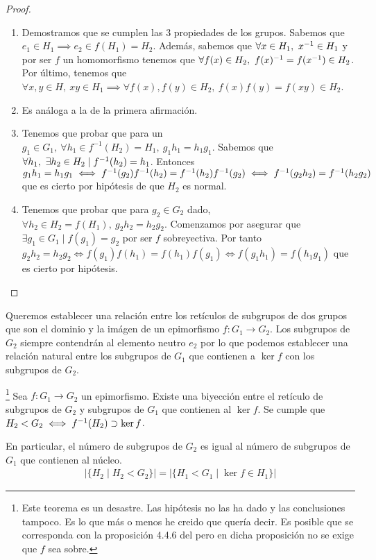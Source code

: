 \begin{proof}$ $\newline
	\begin{enumerate}
		\item Demostramos que se cumplen las 3 propiedades de los grupos. Sabemos que $e_1 \in H_1 \implies e_2 \in f(H_1) = H_2$. Además, sabemos que $\forall x \in H_1,\ \inv{x} \in H_1$ y por ser $f$ un homomorfismo tenemos que $\forall f(x) \in H_2,\ f(x)^{-1} = f(x^{-1}) \in H_2$. Por último, tenemos que $\forall x,y \in H,\ xy \in H_1 \implies \forall f(x),f(y) \in H_2,\ f(x)f(y) = f(xy) \in H_2$.
		\item Es análoga a la de la primera afirmación.
		\item Tenemos que probar que para un $g_1 \in G_1,\ \forall h_1 \in f^{-1}(H_2) = H_1,\ g_1 h_1 = h_1 g_1$. Sabemos que $\forall h_1,\ \exists h_2 \in H_2 \mid f^{-1}(h_2) = h_1$. Entonces $g_1h_1 = h_1 g_1 \iff f^{-1}(g_2)f^{-1}(h_2) = f^{-1}(h_2)f^{-1}(g_2) \iff f^{-1}(g_2h_2) = f^{-1}(h_2g_2)$ que es cierto por hipótesis de que $H_2$ es normal.
		\item Tenemos que probar que para $g_2 \in G_2$ dado, $\forall h_2 \in H_2 = f(H_1),\ g_2h_2 = h_2g_2$. Comenzamos por asegurar que $\exists g_1 \in G_1 \mid f(g_1) = g_2$ por ser $f$ sobreyectiva. Por tanto $g_2h_2 = h_2 g_2 \iff f(g_1)f(h_1) = f(h_1)f(g_1) \iff f(g_1h_1) = f(h_1g_1)$ que es cierto por hipótesis.
	\end{enumerate}
\end{proof}

Queremos establecer una relación entre los retículos de subgrupos de dos grupos que son el dominio y la imágen de un epimorfismo $f: G_1 \to G_2$. Los subgrupos de $G_2$ siempre contendrán al elemento neutro $e_2$ por lo que podemos establecer una relación natural entre los subgrupos de $G_1$ que contienen a $\ker f$ con los subgrupos de $G_2$.

\begin{thm}\label{thm:correspondenciasubgrupos}\footnote{Este teorema es un desastre. Las hipótesis no las ha dado y las conclusiones tampoco. Es lo que más o menos he creido que quería decir. Es posible que se corresponda con la proposición 4.4.6 del \cite{dor96} pero en dicha proposición no se exige que $f$ sea sobre.}
	Sea $f: G_1 \to G_2$ un epimorfismo. Existe una biyección entre el retículo de subgrupos de $G_2$ y subgrupos de $G_1$ que contienen al $\ker f$. Se cumple que $H_2 < G_2 \iff f^{-1}(H_2) \supset \ker f$.
	
	En particular, el número de subgrupos de $G_2$ es igual al número de subgrupos de $G_1$ que contienen al núcleo.
	\begin{align*}
		|\{H_2 \mid H_2 < G_2\}| = |\{H_1 < G_1 \mid \ker f \in H_1\}|
	\end{align*}
\end{thm}

